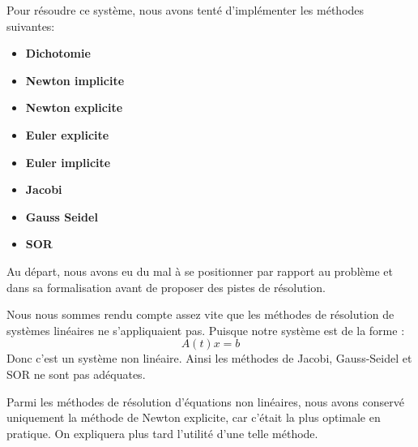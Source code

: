 \documentclass[12pt]{article}
\theoremstyle{saav}
\newcommand{\sk}{\smallskip}
\newcommand{\bk}{\bigskip}
\begin{document}
	Pour résoudre ce système, nous avons tenté d'implémenter les méthodes suivantes:
	\begin{itemize}[label*=\textbullet]
		\item \textbf{Dichotomie}
		
		\item \textbf{Newton implicite}
		
		\item \textbf{Newton explicite}
		
		\item \textbf{Euler explicite} 
		
		\item \textbf{Euler implicite}
		
		\item \textbf{Jacobi}
		\item \textbf{Gauss Seidel}
		\item \textbf{SOR}
		
	\end{itemize}
	Au départ, nous avons eu du mal à se positionner par rapport au problème et dans sa formalisation avant de proposer des pistes de résolution.
	
	
	Nous nous sommes rendu compte assez vite que les méthodes de résolution de systèmes linéaires ne s'appliquaient pas. Puisque notre système est de la forme : \begin{equation*}
		A(t)x = b
	\end{equation*}
	Donc c'est un système non linéaire. Ainsi les méthodes de Jacobi, Gauss-Seidel et SOR ne sont pas adéquates.
	\sk 
	
	
	Parmi les méthodes de résolution d'équations non linéaires, nous avons conservé uniquement la méthode de Newton explicite, car c'était la plus optimale en pratique. On expliquera plus tard l'utilité d'une telle méthode.
	\bk 
	
\end{document}
